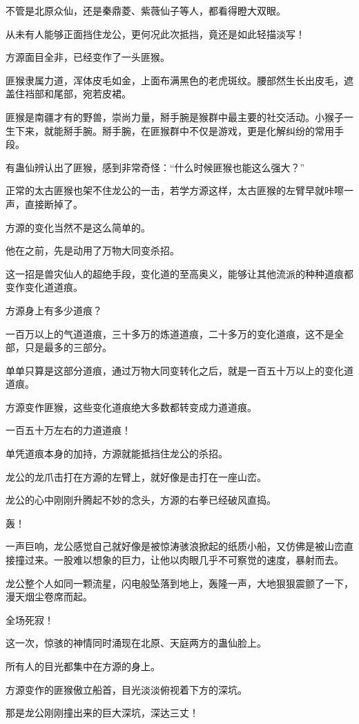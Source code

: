 \begin{this_body}
不管是北原众仙，还是秦鼎菱、紫薇仙子等人，都看得瞪大双眼。

从未有人能够正面挡住龙公，更何况此次抵挡，竟还是如此轻描淡写！

方源面目全非，已经变作了一头匪猴。

匪猴隶属力道，浑体皮毛如金，上面布满黑色的老虎斑纹。腰部然生长出皮毛，遮盖住裆部和尾部，宛若皮裙。

匪猴是南疆才有的野兽，崇尚力量，掰手腕是猴群中最主要的社交活动。小猴子一生下来，就能掰手腕。掰手腕，在匪猴群中不仅是游戏，更是化解纠纷的常用手段。

有蛊仙辨认出了匪猴，感到非常奇怪：“什么时候匪猴也能这么强大？”

正常的太古匪猴也架不住龙公的一击，若学方源这样，太古匪猴的左臂早就咔嚓一声，直接断掉了。

方源的变化当然不是这么简单的。

他在之前，先是动用了万物大同变杀招。

这一招是兽灾仙人的超绝手段，变化道的至高奥义，能够让其他流派的种种道痕都变作变化道道痕。

方源身上有多少道痕？

一百万以上的气道道痕，三十多万的炼道道痕，二十多万的变化道痕，这不是全部，只是最多的三部分。

单单只算是这部分道痕，通过万物大同变转化之后，就是一百五十万以上的变化道道痕。

方源变作匪猴，这些变化道痕绝大多数都转变成力道道痕。

一百五十万左右的力道道痕！

单凭道痕本身的加持，方源就能抵挡住龙公的杀招。

龙公的龙爪击打在方源的左臂上，就好像是击打在一座山峦。

龙公的心中刚刚升腾起不妙的念头，方源的右拳已经破风直捣。

轰！

一声巨响，龙公感觉自己就好像是被惊涛骇浪掀起的纸质小船，又仿佛是被山峦直接撞过来。一股难以想象的巨力，让他以肉眼几乎不可察觉的速度，暴射而去。

龙公整个人如同一颗流星，闪电般坠落到地上，轰隆一声，大地狠狠震颤了一下，漫天烟尘卷席而起。

全场死寂！

这一次，惊骇的神情同时涌现在北原、天庭两方的蛊仙脸上。

所有人的目光都集中在方源的身上。

方源变作的匪猴傲立船首，目光淡淡俯视着下方的深坑。

那是龙公刚刚撞出来的巨大深坑，深达三丈！

\end{this_body}

